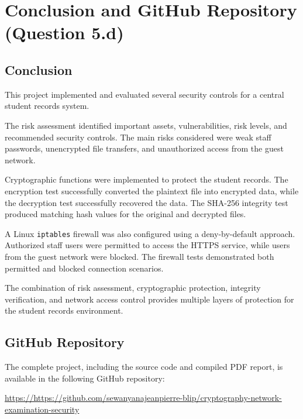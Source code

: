 \documentclass[12pt,a4paper]{article}
\begin{document}

\newpage

\section{Conclusion and GitHub Repository (Question 5.d)}

\subsection{Conclusion}

This project implemented and evaluated several security controls for a central student records system.

The risk assessment identified important assets, vulnerabilities, risk levels, and recommended security controls. The main risks considered were weak staff passwords, unencrypted file transfers, and unauthorized access from the guest network.

Cryptographic functions were implemented to protect the student records. The encryption test successfully converted the plaintext file into encrypted data, while the decryption test successfully recovered the data. The SHA-256 integrity test produced matching hash values for the original and decrypted files.

A Linux \texttt{iptables} firewall was also configured using a deny-by-default approach. Authorized staff users were permitted to access the HTTPS service, while users from the guest network were blocked. The firewall tests demonstrated both permitted and blocked connection scenarios.

The combination of risk assessment, cryptographic protection, integrity verification, and network access control provides multiple layers of protection for the student records environment.

\subsection{GitHub Repository}

The complete project, including the source code and compiled PDF report, is available in the following GitHub repository:

\begin{center}
\url{https://https://github.com/sewanyanajeanpierre-blip/cryptography-network-examination-security}
\end{center}

\end{document}
